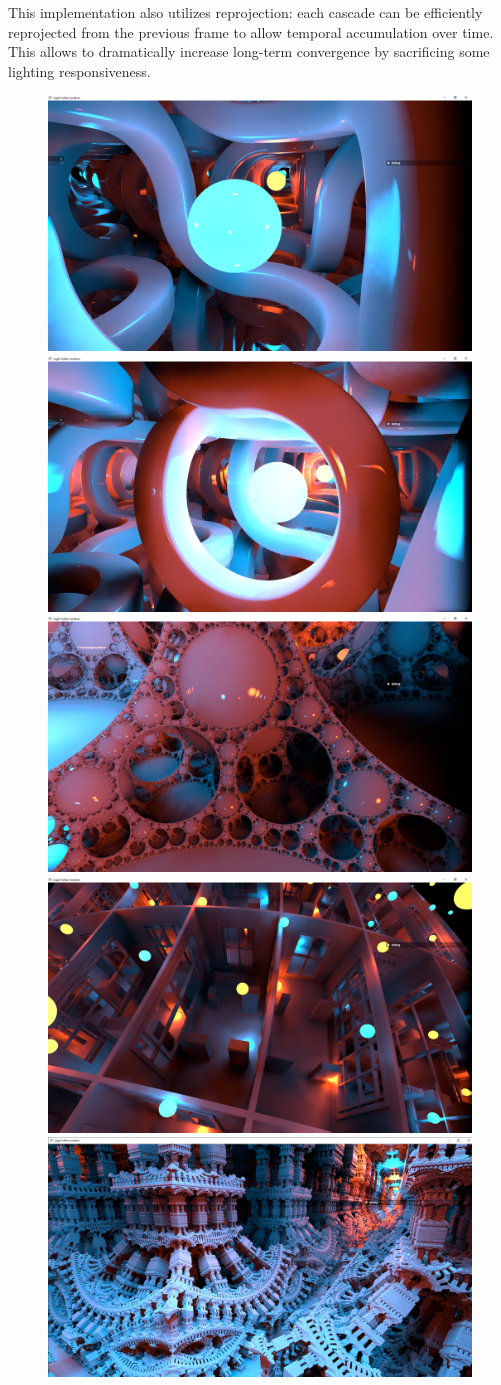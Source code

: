 \documentclass{jcgt}
\begin{document}
This implementation also utilizes reprojection: each cascade can be efficiently reprojected from the previous frame to allow temporal accumulation over time. This allows to dramatically increase long-term convergence by sacrificing some lighting responsiveness.

\begin{figure}[htb]
  \centering
  \includegraphics[width=0.49\columnwidth]{images/sdf_reprojection_truchet.png}
  \includegraphics[width=0.49\columnwidth]{images/sdf_reprojection_truchet2.png}
  \includegraphics[width=0.49\columnwidth]{images/sdf_apollonian.png}
  \includegraphics[width=0.49\columnwidth]{images/sdf_leon_torus_1.png}
  \includegraphics[width=0.49\columnwidth]{images/sdf_temple.png}

\end{figure}
\end{document}
